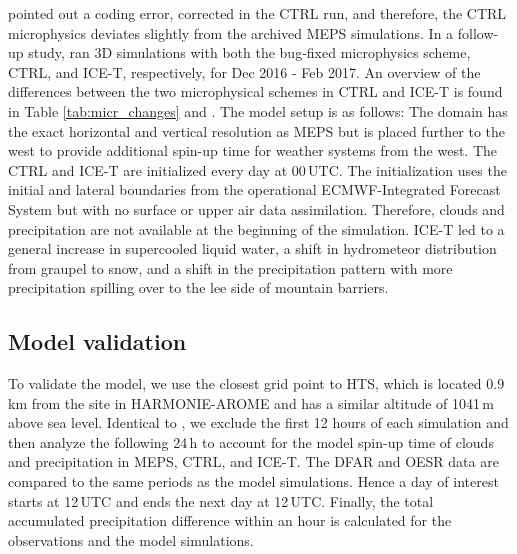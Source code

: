 \documentclass{ametsocV5}
\begin{document}
	 	\citet{engdahl_improving_2020} pointed out a coding error, corrected in the CTRL run, and therefore, the CTRL microphysics deviates slightly from the archived MEPS simulations. In a follow-up study, \citet{engdahl_effects_2020} ran 3D simulations with both the bug-fixed microphysics scheme, CTRL, and ICE-T, respectively, for Dec 2016 - Feb 2017. An overview of the differences between the two microphysical schemes in CTRL and ICE-T is found in Table \ref{tab:micr_changes} and \citet{engdahl_improving_2020}. The \citet{engdahl_effects_2020} model setup is as follows: The domain has the exact horizontal and vertical resolution as MEPS but is placed further to the west to provide additional spin-up time for weather systems from the west. The CTRL and ICE-T are initialized every day at 00\,UTC. The initialization uses the initial and lateral boundaries from the operational ECMWF-Integrated Forecast System but with no surface or upper air data assimilation. Therefore, clouds and precipitation are not available at the beginning of the simulation. ICE-T led to a general increase in supercooled liquid water, a shift in hydrometeor distribution from graupel to snow, and a shift in the precipitation pattern with more precipitation spilling over to the lee side of mountain barriers.
		
		
		
	\subsection{Model validation}\label{sec:methodology:MEPS_vali}
		To validate the model, we use the closest grid point to HTS, which is located 0.9\,km from the site in HARMONIE-AROME and has a similar altitude of 1041\,m above sea level. Identical to \citet{engdahl_effects_2020}, we exclude the first 12 hours of each simulation and then analyze the following 24\,h to account for the model spin-up time of clouds and precipitation in MEPS, CTRL, and ICE-T. The DFAR and OESR data are compared to the same periods as the model simulations. Hence a day of interest starts at 12\,UTC and ends the next day at 12\,UTC. Finally, the total accumulated precipitation difference within an hour is calculated for the observations and the model simulations. 
		
\end{document}

